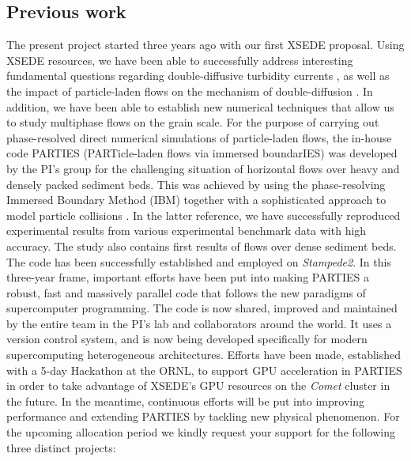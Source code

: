 \documentclass[10pt]{article}
\begin{document}
\subsection*{Previous work}
The present project started three years ago with our first XSEDE proposal. Using XSEDE resources, we have been able to successfully address interesting fundamental questions regarding double-diffusive turbidity currents \cite{konopliv2016}, as well as the impact of particle-laden flows on the mechanism of double-diffusion \cite{alsinan2016,Reali2017}. In addition, we have been able to establish new numerical techniques that allow us to study multiphase flows on the grain scale. For the purpose of carrying out phase-resolved direct numerical simulations of particle-laden flows, the in-house code PARTIES (PARTicle-laden flows via immersed boundarIES) was developed by the PI's group for the challenging situation of horizontal flows over heavy and densely packed sediment beds.  This was achieved by using the phase-resolving Immersed Boundary Method (IBM) \cite{uhlmann2005} together with a sophisticated approach to model particle collisions \cite{biegert2016}. In the latter reference, we have successfully reproduced experimental results from various experimental benchmark data with high accuracy. The study also contains first results of flows over dense sediment beds.  The code has been successfully established and employed on {\em Stampede2}. In this three-year frame, important efforts have been put into making PARTIES a robust, fast and massively parallel code that follows the new paradigms of supercomputer programming. The code is now shared, improved and maintained by the entire team in the PI's lab and collaborators around the world. It  uses a version control system, and is now being developed specifically for modern supercomputing heterogeneous architectures. Efforts have been made, established with a 5-day Hackathon at the ORNL, to support GPU acceleration in PARTIES in order to take advantage of XSEDE's GPU resources on the \emph{Comet} cluster in the future. In the meantime, continuous efforts will be put into improving performance and extending PARTIES  by tackling new physical phenomenon. For the upcoming allocation period we kindly request your support for the following three distinct projects:       %
\end{document}
